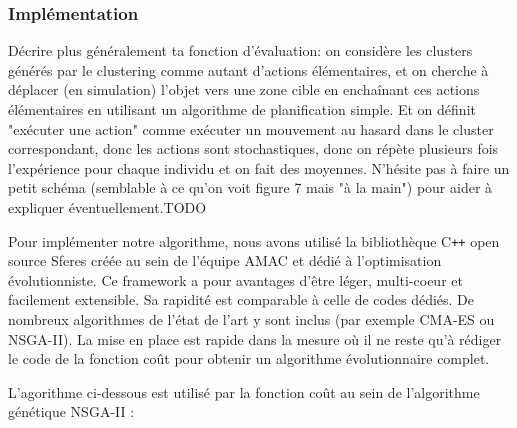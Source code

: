 \documentclass{llncs}
\begin{document}
\subsubsection{Implémentation}

Décrire plus généralement ta fonction d'évaluation: on considère les clusters générés par le clustering comme autant d'actions élémentaires, et on cherche à déplacer (en simulation) l'objet vers une zone cible en enchaînant ces actions élémentaires en utilisant un algorithme de planification simple. Et on définit "exécuter une action" comme exécuter un mouvement au hasard dans le cluster correspondant, donc les actions sont stochastiques, donc on répète plusieurs fois l'expérience pour chaque individu et on fait des moyennes. N'hésite pas à faire un petit schéma (semblable à ce qu'on voit figure 7 mais "à la main") pour aider à expliquer éventuellement.TODO

Pour implémenter notre algorithme, nous avons utilisé la bibliothèque C{}\verb!++! open source Sferes \cite{Mouret2010} créée au sein de l'équipe AMAC et dédié à l'optimisation évolutionniste.
Ce framework a pour avantages d'être léger, multi-coeur et facilement extensible.
Sa rapidité est comparable à celle de codes dédiés.
De nombreux algorithmes de l'état de l'art y sont inclus (par exemple CMA-ES ou NSGA-II).
La mise en place est rapide dans la mesure où il ne reste qu'à rédiger le code de la fonction coût pour obtenir un algorithme évolutionnaire complet.

L'agorithme ci-dessous est utilisé par la fonction coût au sein de l'algorithme génétique NSGA-II :
\end{document}
